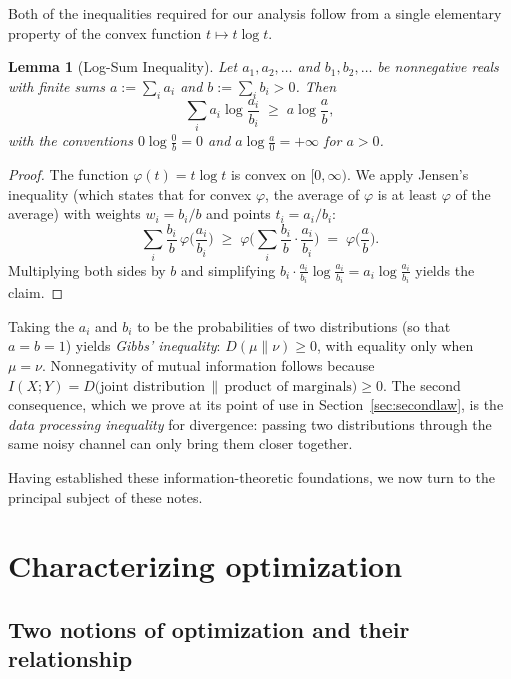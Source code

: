 \documentclass[10pt]{article}
\newtheorem{lemma}[theorem]{Lemma}
\theoremstyle{definition}
\theoremstyle{remark}
\begin{document}
Both of the inequalities required for our analysis follow from a single elementary property of the convex function $t \mapsto t \log t$.

\begin{lemma}[Log-Sum Inequality]
\label{lem:logsum}
Let $a_1, a_2, \dots$ and $b_1, b_2, \dots$ be nonnegative reals with finite sums $a := \sum_i a_i$ and $b := \sum_i b_i > 0$. Then
\[
\sum_i a_i \log \frac{a_i}{b_i} \;\ge\; a \log \frac{a}{b},
\]
with the conventions $0 \log \frac{0}{b} = 0$ and $a \log \frac{a}{0} = +\infty$ for $a > 0$.
\end{lemma}

\begin{proof}
The function $\varphi(t) = t \log t$ is convex on $[0, \infty)$. We apply Jensen's inequality (which states that for convex $\varphi$, the average of $\varphi$ is at least $\varphi$ of the average) with weights $w_i = b_i / b$ and points $t_i = a_i / b_i$:
\[
\sum_i \frac{b_i}{b}\, \varphi\!\Big(\frac{a_i}{b_i}\Big) \;\ge\; \varphi\!\Big(\sum_i \frac{b_i}{b} \cdot \frac{a_i}{b_i}\Big) \;=\; \varphi\!\Big(\frac{a}{b}\Big).
\]
Multiplying both sides by $b$ and simplifying $b_i \cdot \frac{a_i}{b_i}\log\frac{a_i}{b_i} = a_i \log \frac{a_i}{b_i}$ yields the claim.
\end{proof}

Taking the $a_i$ and $b_i$ to be the probabilities of two distributions (so that $a = b = 1$) yields \emph{Gibbs' inequality}: $D(\mu \| \nu) \ge 0$, with equality only when $\mu = \nu$. Nonnegativity of mutual information follows because $I(X;Y) = D\big(\text{joint distribution} \,\|\, \text{product of marginals}\big) \ge 0$. The second consequence, which we prove at its point of use in Section~\ref{sec:secondlaw}, is the \emph{data processing inequality} for divergence: passing two distributions through the same noisy channel can only bring them closer together.

Having established these information-theoretic foundations, we now turn to the principal subject of these notes.
\section{Characterizing optimization}
\label{sec:optsys}

\subsection{Two notions of optimization and their relationship}
\end{document}
